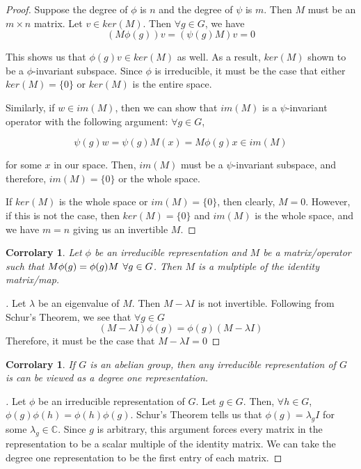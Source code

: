 \documentclass[10pt]{ucthesis}
\newcommand{\C}{\mathbb{C}}
\newtheorem{corrolary}[definition]{Corrolary}
\begin{document}
\begin{proof}Suppose the degree of $\phi$ is $n$ and the degree of $\psi$ is $m$. Then $M$ must be an $m\times n$ matrix. Let $v\in ker(M)$. Then $\forall g \in G$, we have 
\begin{equation}
	 (M\phi(g))v= (\psi(g)M)v = 0
\end{equation}

This shows us that $\phi(g)v \in ker(M)$ as well. As a result, $ker(M)$ shown to be a $\phi$-invariant subspace. Since $\phi$ is irreducible, it must be the case that either $ker(M) =\{0\}$ or $ker(M)$ is the entire space.  

Similarly, if $w \in im(M)$, then we can show that $im(M)$ is a $\psi$-invariant operator with the following argument: $\forall g\in G$,

\begin{equation}
	\psi(g)w =\psi(g)M(x) = M\phi(g)x \in im(M)
\end{equation}

for some $x$ in our space. Then, $im(M)$ must be a $\psi$-invariant subspace, and therefore, $im(M) = \{0\}$ or the whole space.

If $ker(M)$ is the whole space or $im(M) = \{0\}$, then clearly, $M=0$. However, if this is not the case, then $ker(M) = \{0\}$ and $im(M)$ is the whole space, and we have $m=n$ giving us an invertible $M$. \end{proof}

\begin{corrolary}
	Let $\phi$ be an irreducible representation and $M$ be a matrix/operator such that $M\phi(g)=\phi(g)M \hspace{1.5mm}\forall g \in G$. Then $M$ is a mulptiple of the identity matrix/map.
\end{corrolary}

\begin{proof}[\cite{Mendes}]Let $\lambda$ be an eigenvalue of $M$. Then $M - \lambda I$ is not invertible. Following from Schur's Theorem, we see that $\forall g \in G$
$$(M-\lambda I)\phi(g) = \phi(g) (M-\lambda I)$$
Therefore, it must be the case that $M-\lambda I = 0$ \end{proof}

\begin{corrolary}
	If $G$ is an abelian group, then any irreducible representation of $G$ is can be viewed as a degree one representation.
\end{corrolary}

\begin{proof}[\cite{Tung}]Let $\phi$ be an irreducible representation of $G$. Let $g \in G$. Then, $\forall h \in G$, $\phi(g)\phi(h) = \phi(h)\phi(g)$. Schur's Theorem tells us that $\phi(g) = \lambda_g I$ for some $\lambda_g \in \C$. Since $g$ is arbitrary, this argument forces every matrix in the representation to be a scalar multiple of the identity matrix. We can take the degree one representation to be the first entry of each matrix.  \end{proof}
\end{document}
